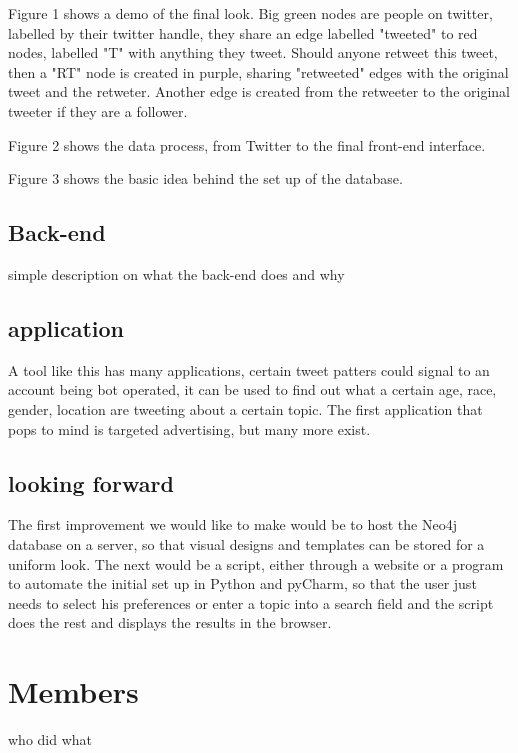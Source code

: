 \documentclass[11pt]{article}
\begin{document}
Figure 1 shows a demo of the final look. Big green nodes are people on twitter, labelled by their twitter handle, they share an edge labelled "tweeted" to red nodes, labelled "T" with anything they tweet. Should anyone retweet this tweet, then a "RT" node is created in purple, sharing "retweeted" edges with the original tweet and the retweter. Another edge is created from the retweeter to the original tweeter if they are a follower.

Figure 2 shows the data process, from Twitter to the final front-end interface. 

Figure 3 shows the basic idea behind the set up of the database.

\subsection{Back-end}
simple description on what the back-end does and why
\subsection{application}
A tool like this has many applications, certain tweet patters could signal to an account being bot operated, it can be used to find out what a certain age, race, gender, location are tweeting about a certain topic. The first application that pops to mind is targeted advertising, but many more exist.

\subsection{looking forward}
The first improvement we would like to make would be to host the Neo4j database on a server, so that visual designs and templates can be stored for a uniform look. The next would be a script, either through a website or a program to automate the initial set up in Python and pyCharm, so that the user just needs to select his preferences or enter a topic into a search field and the script does the rest and displays the results in the browser.

\section{Members}
who did what
\end{document}
